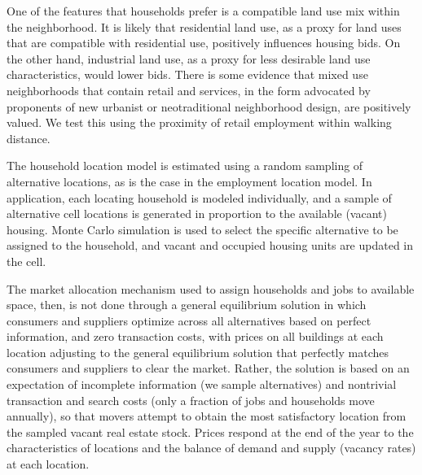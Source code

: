 \documentclass[fleqn]{article}
\begin{document}
One of the features that households prefer is a compatible land
use mix within the neighborhood.  It is likely that residential
land use, as a proxy for land uses that are compatible with
residential use, positively influences housing bids.   On the
other hand, industrial land use, as a proxy for less desirable
land use characteristics, would lower bids.  There is some
evidence that mixed use neighborhoods that contain retail and
services, in the form advocated by proponents of new urbanist or
neotraditional neighborhood design, are positively valued.  We
test this using the proximity of retail employment within walking
distance.


The household location model is estimated using a random sampling
of alternative locations, as is the case in the employment
location model. In application, each locating household is modeled
individually, and a sample of alternative cell locations is
generated in proportion to the available (vacant) housing. Monte
Carlo simulation is used to select the specific alternative to be
assigned to the household, and vacant and occupied housing units
are updated in the cell.


The market allocation mechanism used to assign households and jobs
to available space, then, is not done through a general
equilibrium solution in which consumers and suppliers optimize
across all alternatives based on perfect information, and zero
transaction costs, with prices on all buildings at each location
adjusting to the general equilibrium solution that perfectly
matches consumers and suppliers to clear the market. Rather, the
solution is based on an expectation of incomplete information (we
sample alternatives) and nontrivial transaction and search costs
(only a fraction of jobs and households move annually), so that
movers attempt to obtain the most satisfactory location from the
sampled vacant real estate stock.  Prices respond at the end of
the year to the characteristics of locations and the balance of
demand and supply (vacancy rates) at each location.

\end{document}
